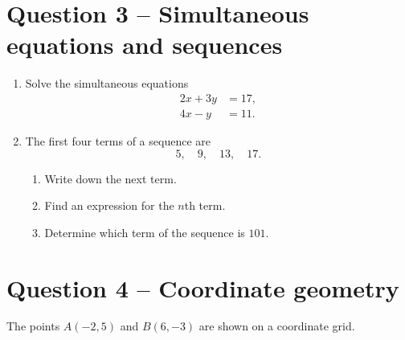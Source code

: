 	\vspace{5mm}
	
	\section*{Question 3 -- Simultaneous equations and sequences }
	
	\begin{enumerate}
		
		\item[(a)]
		Solve the simultaneous equations
		\[
		\begin{aligned}
			2x+3y&=17,\\
			4x-y&=11.
		\end{aligned}
		\]
		
		\vspace{30mm}
		
		\item[(b)]
		The first four terms of a sequence are
		\[
		5,\quad 9,\quad 13,\quad 17.
		\]
		
		\begin{enumerate}
			\item[(i)]
			Write down the next term.
			
			\item[(ii)]
			Find an expression for the \(n\)th term.
			
			\item[(iii)]
			Determine which term of the sequence is \(101\).
		\end{enumerate}
		
	\end{enumerate}
	
	\newpage
	
	\section*{Question 4 -- Coordinate geometry }
	
	The points \(A(-2,5)\) and \(B(6,-3)\) are shown on a coordinate grid.
	
